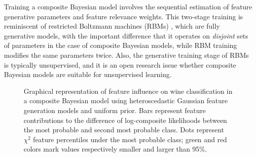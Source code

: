 \documentclass[english]{scrartcl}
\begin{document}
Training a composite Bayesian model involves the sequential estimation of feature generative parameters and feature relevance weights. This two-stage training is reminiscent of restricted Boltzmann machines (RBMs) \cite{Hinton-06,Fischer-14}, which are fully generative models, with the important difference that it operates on {\em disjoint} sets of parameters in the case of composite Bayesian models, while RBM training modifies the same parameters twice. Also, the generative training stage of RBMs is typically unsupervised, and it is an open research issue whether composite Bayesian models are suitable for unsupervised learning.

\begin{figure}[!ht]
\begin{center}
\end{center}
\caption{Graphical representation of feature influence on wine classification in a composite Bayesian model using heteroscedastic Gaussian feature generation models and uniform prior. Bars represent feature contributions to the difference of log-composite likelihoods between the most probable and second most probable class. Dots represent $\chi^2$ feature percentiles under the most probable class; green and red colors mark values respectively smaller and larger than 95\%.}
\label{fig:interp}
\end{figure}
\end{document}
